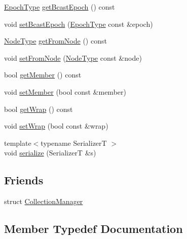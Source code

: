 \begin{DoxyCompactItemize}
\item 
\hyperlink{namespacevt_a985a5adf291c34a3ca263b3378388236}{Epoch\+Type} \hyperlink{structvt_1_1vrt_1_1collection_1_1_collection_message_a81604b8f38e3ee3eea6caf6a1012175c}{get\+Bcast\+Epoch} () const
\item 
void \hyperlink{structvt_1_1vrt_1_1collection_1_1_collection_message_a513a81678ec43a110e39d957735831bd}{set\+Bcast\+Epoch} (\hyperlink{namespacevt_a985a5adf291c34a3ca263b3378388236}{Epoch\+Type} const \&epoch)
\item 
\hyperlink{namespacevt_a866da9d0efc19c0a1ce79e9e492f47e2}{Node\+Type} \hyperlink{structvt_1_1vrt_1_1collection_1_1_collection_message_a642d64890e3ef47a5561ceaede752181}{get\+From\+Node} () const
\item 
void \hyperlink{structvt_1_1vrt_1_1collection_1_1_collection_message_a5bd7fd9ea84e15d528e1546a98f4bd5e}{set\+From\+Node} (\hyperlink{namespacevt_a866da9d0efc19c0a1ce79e9e492f47e2}{Node\+Type} const \&node)
\item 
bool \hyperlink{structvt_1_1vrt_1_1collection_1_1_collection_message_a6e3627adc70baecfd59a095e70729fee}{get\+Member} () const
\item 
void \hyperlink{structvt_1_1vrt_1_1collection_1_1_collection_message_a7ab28aae693beb9ffea7eed409fe3ccf}{set\+Member} (bool const \&member)
\item 
bool \hyperlink{structvt_1_1vrt_1_1collection_1_1_collection_message_adb0f0904b4bd0646e51dc0a76c54d487}{get\+Wrap} () const
\item 
void \hyperlink{structvt_1_1vrt_1_1collection_1_1_collection_message_a0c5a8830f6079278d7df90d0b6fc07b5}{set\+Wrap} (bool const \&wrap)
\item 
{\footnotesize template$<$typename SerializerT $>$ }\\void \hyperlink{structvt_1_1vrt_1_1collection_1_1_collection_message_a330305ca4c3bf4fec81d0f02637b9a59}{serialize} (SerializerT \&s)
\end{DoxyCompactItemize}
\subsection*{Friends}
\begin{DoxyCompactItemize}
\item 
struct \hyperlink{structvt_1_1vrt_1_1collection_1_1_collection_message_af9288b1963f434a90b307b5305a49510}{Collection\+Manager}
\end{DoxyCompactItemize}


\subsection{Member Typedef Documentation}
\mbox{\label{structvt_1_1vrt_1_1collection_1_1_collection_message_afa8f7f5da0139ffa449144d8d35d7fe3}} 
